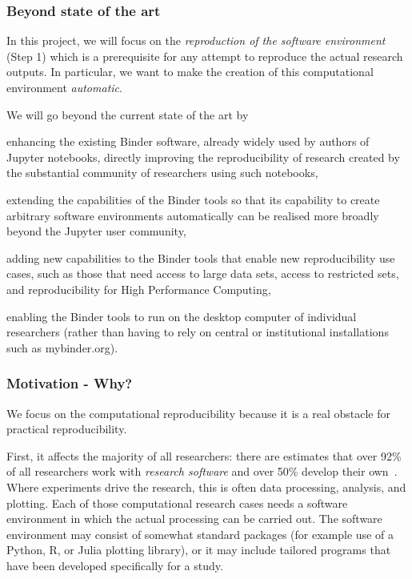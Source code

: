 \subsubsection{Beyond state of the art}

In this project, we will focus on the \emph{reproduction of the
  software environment} (Step 1) which is a prerequisite for any attempt to
reproduce the actual research outputs. In particular, we want to make the
creation of this computational environment \emph{automatic}.

We will go beyond the current state of the art by
\begin{compactitem}
\item enhancing the existing Binder software, already widely used by authors of Jupyter notebooks,
  directly improving the reproducibility of research created by the substantial
  community of researchers using such notebooks,
\item extending the capabilities of the Binder tools so that its capability to
  create arbitrary software environments automatically can be realised more broadly beyond the
  Jupyter user community,
\item adding new capabilities to the Binder tools that enable new reproducibility
  use cases, such as those that need access to large data sets, access to restricted sets,
  and reproducibility for High Performance Computing,
\item enabling the Binder tools to run on the desktop computer of individual
  researchers (rather than having to rely on central or institutional
  installations such as mybinder.org).
\end{compactitem}

\subsubsection{Motivation - Why?}\label{sec:motivation-why}

We focus on the computational reproducibility because it is a real
obstacle for practical reproducibility.

First, it affects the majority of all researchers: there are estimates that over
92\% of all researchers work with \emph{research software} and over 50\% develop
their own~\cite{Hettrick2014}. Where experiments drive the research, this is
often data processing, analysis, and plotting. Each of those computational
research cases needs a software environment in which the actual processing can
be carried out. The software environment may consist of somewhat standard
packages (for example use of a Python, R, or Julia plotting library), or it may
include tailored programs that have been developed specifically for a study.

